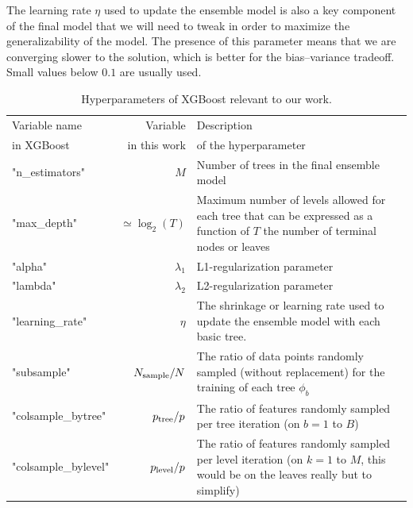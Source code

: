 \documentclass[main]{subfiles}
\begin{document}
The learning rate $\eta$ used to update the ensemble model is also a key component of the final model that we will need to tweak in order to maximize the generalizability of the model. The presence of this parameter means that we are converging slower to the solution, which is better for the bias--variance tradeoff. Small values below $0.1$ are usually used.

\begin{table}[ht]
  \centering
  \begin{tabular}{|l|r|m{8cm}|}
  \hline
    Variable name  &  Variable   &   Description\\
    in XGBoost  &    in this work &  of the hyperparameter \\
  \hline
      "n\_estimators" &   $M$ &   Number of trees in the final ensemble model  \\
      "max\_depth" &      $\simeq\log_2(T)$ &   Maximum number of levels allowed for each tree that can be expressed as a function of $T$ the number of terminal nodes or leaves \\
      "alpha" &   $\lambda_1$ &   L1-regularization parameter  \\
      "lambda" &   $\lambda_2$ &  L2-regularization parameter  \\
      "learning\_rate" &   $\eta$ &   The shrinkage or learning rate used to update the ensemble model with each basic tree.  \\
      "subsample" &   $N_{\text{sample}}/N$ &   The ratio of data points randomly sampled (without replacement) for the training of each tree $\phi_b$  \\
      "colsample\_bytree" &   $p_{\text{tree}}/p$  &   The ratio of features randomly sampled per tree iteration (on $b=1$ to $B$)  \\
      "colsample\_bylevel" &   $p_{\text{level}}/p$  &   The ratio of features randomly sampled per level iteration (on $k=1$ to $M$, this would be on the leaves really but to simplify) \\
  \hline
  \end{tabular}
  \caption{Hyperparameters of XGBoost relevant to our work.}\label{tab:hyperparameter}
\end{table}
\end{document}
